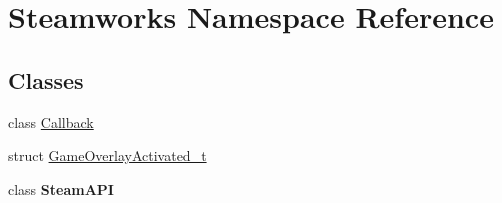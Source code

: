 \hypertarget{namespace_steamworks}{}\section{Steamworks Namespace Reference}
\label{namespace_steamworks}
\subsection*{Classes}
\begin{DoxyCompactItemize}
\item 
class \hyperlink{class_steamworks_1_1_callback}{Callback}
\item 
struct \hyperlink{struct_steamworks_1_1_game_overlay_activated__t}{Game\+Overlay\+Activated\+\_\+t}
\item 
class {\bfseries Steam\+A\+P\+I}
\end{DoxyCompactItemize}
